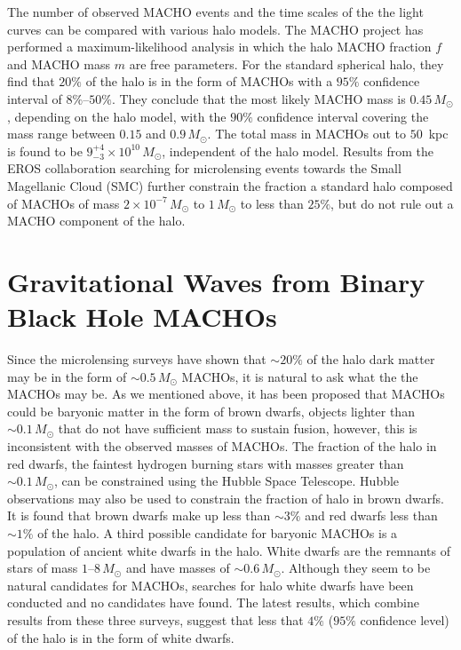 The number of observed MACHO events and the time scales of the the light
curves can be compared with various halo models. The MACHO project has
performed a maximum-likelihood analysis in which the halo MACHO fraction $f$
and MACHO mass $m$ are free parameters. For the standard spherical halo, they
find that $20\%$ of the halo is in the form of MACHOs with a $95\%$ confidence
interval of $8\%$--$50\%$. They conclude that the most likely MACHO mass is
$0.45\,M_\odot$, depending on the halo model, with the $90\%$ confidence
interval covering the mass range between $0.15$ and $0.9\,M_\odot$. The total
mass in MACHOs out to $50$~kpc is found to be $9_{-3}^{+4} \times
10^{10}\,M_\odot$, independent of the halo model\cite{Alcock:2000ph}. Results
from the EROS collaboration\cite{Afonso:2002xq} searching for microlensing
events towards the Small Magellanic Cloud (SMC) further constrain the fraction
a standard halo composed of MACHOs of mass $2 \times 10^{-7}\,M_\odot$ to $1\,
M_\odot$ to less than $25\%$, but do not rule out a MACHO component of the
halo.

\section{Gravitational Waves from Binary Black Hole MACHOs}
\label{s:bbhmacho}

Since the microlensing surveys have shown that $\sim 20\%$ of the halo dark
matter may be in the form of $\sim 0.5\,M_\odot$ MACHOs, it is natural to ask
what the the MACHOs may be. As we mentioned above, it has been proposed that
MACHOs could be baryonic matter in the form of brown dwarfs, objects lighter
than $\sim 0.1\,M_\odot$ that do not have sufficient mass to sustain fusion,
however, this is inconsistent with the observed masses of MACHOs. The fraction
of the halo in red dwarfs, the faintest hydrogen burning stars with masses
greater than $\sim 0.1\,M_\odot$, can be constrained using the Hubble Space
Telescope. Hubble observations may also be used to constrain the fraction of
halo in brown dwarfs. It is found that brown dwarfs make up less than $\sim
3\%$ and red dwarfs less than $\sim 1\%$ of the
halo\cite{Graff:1995ru,Graff:1996rz}.  A third possible candidate for baryonic
MACHOs is a population of ancient white dwarfs in the halo. White dwarfs are
the remnants of stars of mass $1$--$8\,M_\odot$ and have masses of $\sim
0.6\,M_\odot$. Although they seem to be natural candidates for MACHOs,
searches for halo white dwarfs have been conducted and no candidates have
found\cite{2002A&A...389L..69G,2002ApJ...573..644N,Creze:2004gs}. The latest
results, which combine results from these three surveys, suggest that less
that $4\%$ ($95\%$ confidence level) of the halo is in the form of white
dwarfs\cite{Creze:2004gs}. 

